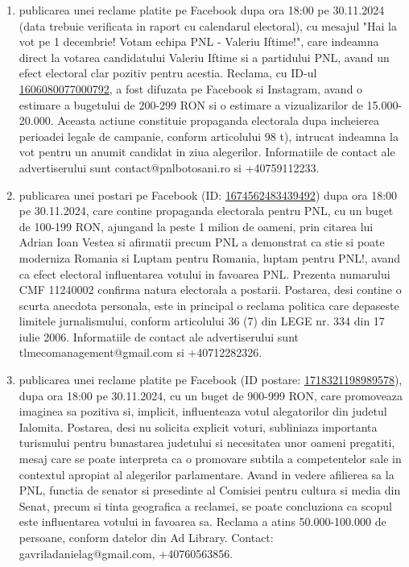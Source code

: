 \documentclass[a4paper,12pt]{article}
\begin{document}
\begin{enumerate}[leftmargin=*, label=\arabic*.)]
    \item publicarea unei reclame platite pe Facebook dupa ora 18:00 pe 30.11.2024 (data trebuie verificata in raport cu calendarul electoral), cu mesajul "Hai la vot pe 1 decembrie! Votam echipa PNL - Valeriu Iftime!", care indeamna direct la votarea candidatului Valeriu Iftime si a partidului PNL, avand un efect electoral clar pozitiv pentru acestia.  Reclama, cu ID-ul \href{https://www.facebook.com/ads/library/?id=1606080077000792}{1606080077000792}, a fost difuzata pe Facebook si Instagram, avand o estimare a bugetului de 200-299 RON si o estimare a vizualizarilor de 15.000-20.000.  Aceasta actiune constituie propaganda electorala dupa incheierea perioadei legale de campanie, conform articolului 98 t), intrucat indeamna la vot pentru un anumit candidat in ziua alegerilor.  Informatiile de contact ale advertiserului sunt contact@pnlbotosani.ro si +40759112233.
    \item publicarea unei postari pe Facebook (ID: \href{https://www.facebook.com/ads/library/?id=1674562483439492}{1674562483439492}) dupa ora 18:00 pe 30.11.2024, care contine propaganda electorala pentru PNL,  cu un buget de 100-199 RON,  ajungand la peste 1 milion de oameni,  prin citarea lui Adrian Ioan Vestea si afirmatii precum PNL a demonstrat ca stie si poate moderniza Romania si Luptam pentru Romania, luptam pentru PNL!,  avand ca efect electoral influentarea votului in favoarea PNL. Prezenta numarului CMF 11240002 confirma natura electorala a postarii.  Postarea, desi contine o scurta anecdota personala, este in principal o reclama politica care depaseste limitele jurnalismului, conform articolului 36 (7) din LEGE nr. 334 din 17 iulie 2006. Informatiile de contact ale advertiserului sunt tlmecomanagement@gmail.com si +40712282326.
    \item publicarea unei reclame platite pe Facebook (ID postare: \href{https://www.facebook.com/ads/library/?id=1718321198989578}{1718321198989578}), dupa ora 18:00 pe 30.11.2024, cu un buget de 900-999 RON, care promoveaza imaginea sa pozitiva si, implicit, influenteaza votul alegatorilor din judetul Ialomita. Postarea, desi nu solicita explicit voturi, subliniaza importanta turismului pentru bunastarea judetului si necesitatea unor oameni pregatiti, mesaj care se poate interpreta ca o promovare subtila a competentelor sale in contextul apropiat al alegerilor parlamentare.  Avand in vedere afilierea sa la PNL, functia de senator si presedinte al Comisiei pentru cultura si media din Senat, precum si tinta geografica a reclamei, se poate concluziona ca scopul este influentarea votului in favoarea sa.  Reclama a atins 50.000-100.000 de persoane, conform datelor din Ad Library.  Contact: gavriladanielag@gmail.com, +40760563856.

\end{enumerate}
\end{document}
